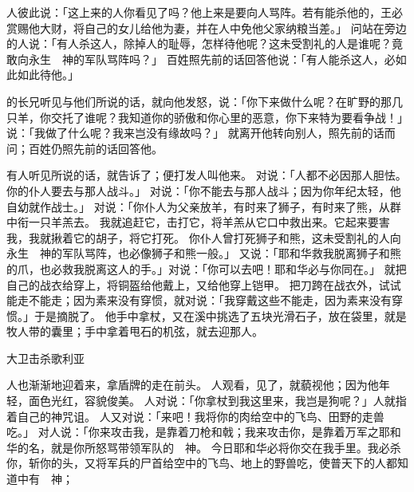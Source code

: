 {人彼此说：「这上来的人你看见了吗？他上来是要向{}人骂阵。若有能杀他的，王必赏赐他大财，将自己的女儿给他为妻，并在{}人中免他父家纳粮当差。」
问站在旁边的人说：「有人杀这{}人，除掉{}人的耻辱，怎样待他呢？这未受割礼的{}人是谁呢？竟敢向永生　神的军队骂阵吗？」
百姓照先前的话回答他说：「有人能杀这{}人，必如此如此待他。」
\par }{\PP {}的长兄{}听见{}与他们所说的话，就向他发怒，说：「你下来做什么呢？在旷野的那几只羊，你交托了谁呢？我知道你的骄傲和你心里的恶意，你下来特为要看争战！」
说：「我做了什么呢？我来岂没有缘故吗？」
就离开他转向别人，照先前的话而问；百姓仍照先前的话回答他。
\par }{\PP {}有人听见{}所说的话，就告诉了{}；{}便打发人叫他来。
对{}说：「人都不必因那{}人胆怯。你的仆人要去与那{}人战斗。」
对{}说：「你不能去与那{}人战斗；因为你年纪太轻，他自幼就作战士。」
对{}说：「你仆人为父亲放羊，有时来了狮子，有时来了熊，从群中衔一只羊羔去。
我就追赶它，击打它，将羊羔从它口中救出来。它起来要害我，我就揪着它的胡子，将它打死。
你仆人曾打死狮子和熊，这未受割礼的{}人向永生　神的军队骂阵，也必像狮子和熊一般。」
又说：「耶和华救我脱离狮子和熊的爪，也必救我脱离这{}人的手。」{}对{}说：「你可以去吧！耶和华必与你同在。」
就把自己的战衣给{}穿上，将铜盔给他戴上，又给他穿上铠甲。
把刀跨在战衣外，试试能走不能走；因为素来没有穿惯，就对{}说：「我穿戴这些不能走，因为素来没有穿惯。」于是摘脱了。
他手中拿杖，又在溪中挑选了五块光滑石子，放在袋里，就是牧人带的囊里；手中拿着甩石的机弦，就去迎那{}人。
\par }{\SH 大卫击杀歌利亚
\par }{\PP {}人也渐渐地迎着{}来，拿盾牌的走在前头。
人观看，见了{}，就藐视他；因为他年轻，面色光红，容貌俊美。
人对{}说：「你拿杖到我这里来，我岂是狗呢？」{}人就指着自己的神咒诅{}。
人又对{}说：「来吧！我将你的肉给空中的飞鸟、田野的走兽吃。」
对{}人说：「你来攻击我，是靠着刀枪和{}戟；我来攻击你，是靠着万军之耶和华的名，就是你所怒骂带领{}军队的　神。
今日耶和华必将你交在我手里。我必杀你，斩你的头，又将{}军兵的尸首给空中的飞鸟、地上的野兽吃，使普天下的人都知道{}中有　神；
}

